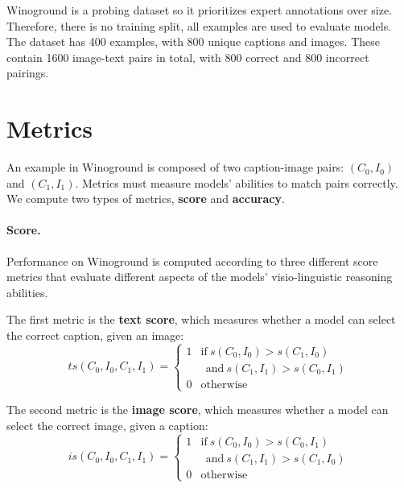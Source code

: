 Winoground is a probing dataset so it prioritizes expert annotations over size. Therefore, there is no training split, all examples are used to evaluate models. The dataset has 400 examples, with 800 unique captions and images. These contain 1600 image-text pairs in total,
with 800 correct and 800 incorrect pairings.

\section{Metrics}

An example in Winoground is composed of two caption-image pairs: $(C_{0},I_{0})$ and $(C_{1},I_{1})$. Metrics must measure models' abilities to match pairs correctly. We compute two types of metrics, \textbf{score} and \textbf{accuracy}.

\paragraph{Score.}
Performance on Winoground \cite{thrush2022winoground} is computed according to three different score metrics that evaluate different aspects of the models' visio-linguistic reasoning abilities.

The first metric is the \textbf{text score}, which measures whether a model can select the correct caption, given an image:
\begin{equation}\label{eq:text-score}
        ts(C_{0},I_{0},C_{1},I_{1})= 
    \begin{cases}
        1 & \text{if}\  s(C_{0}, I_{0}) > s(C_{1}, I_{0}) \\
        & \ \ \text{and}\ s(C_{1}, I_{1}) > s(C_{0}, I_{1}) \\
        0              & \text{otherwise}
    \end{cases}
\end{equation}

The second metric is the \textbf{image score}, which measures whether a model can select the correct image, given a caption:
\begin{equation}\label{eq:image-score}
        is(C_{0},I_{0},C_{1},I_{1})= 
    \begin{cases}
        1 & \text{if}\  s(C_{0}, I_{0}) > s(C_{0}, I_{1})\\
        & \ \ \text{and}\ s(C_{1}, I_{1}) > s(C_{1}, I_{0}) \\
        0              & \text{otherwise}
    \end{cases}
\end{equation}


